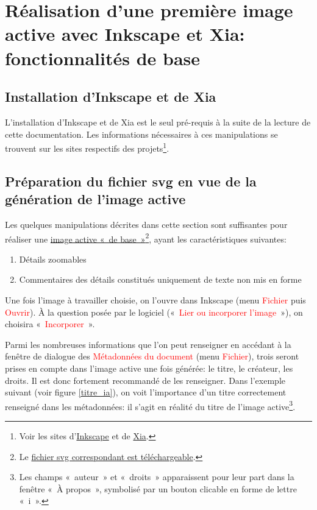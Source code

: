 \documentclass[a4paper,12pt]{report}
\newcommand{\chemin}[1]{\textcolor{red}{#1}}
\begin{document}
\section{Réalisation d'une première image active avec Inkscape et Xia: fonctionnalités de base}

\subsection{Installation d'Inkscape et de Xia}

L'installation d'Inkscape et de Xia est le seul pré-requis à la suite de la lecture de cette documentation.
Les informations nécessaires à ces manipulations se trouvent sur les sites respectifs des projets\footnote{Voir les sites d'\href{http://www.inkscape.org/}{Inkscape} et de \href{http://images-actives.crdp-versailles.fr/beta/}{Xia}.}.

\subsection{Préparation du fichier svg en vue de la génération de l'image active}\label{preparation_svg}

Les quelques manipulations décrites dans cette section sont suffisantes
pour réaliser une \href{http://geoffrey-gekiere.ac-versailles.fr/xia1}{image active «~de base~»}\footnote{Le 
\href{http://geoffrey-gekiere.ac-versailles.fr/xia1/svg/xia1.svg}{fichier svg correspondant est téléchargeable}.}, 
ayant les caractéristiques suivantes:
\begin{enumerate}
 \item Détails zoomables
 \item Commentaires des détails constitués uniquement de texte non mis en forme
\end{enumerate}


Une fois l'image à travailler choisie, on l'ouvre dans Inkscape (menu \chemin{Fichier} puis \chemin{Ouvrir}).
À la question posée par le logiciel («~\chemin{Lier ou incorporer l'image}~»), on choisira «~\chemin{Incorporer}~».

Parmi les nombreuses informations que l'on peut renseigner en accédant à la fenêtre de dialogue des 
\chemin{Métadonnées du document} (menu \chemin{Fichier}), trois seront prises en compte dans l'image active
une fois générée: le titre, le créateur, les droits.
Il est donc fortement recommandé de les renseigner.
Dans l'exemple suivant (voir figure \ref{titre_ia}), on voit l'importance d'un titre correctement
renseigné dans les métadonnées: il s'agit en réalité du titre de l'image active\footnote{Les champs 
«~auteur~» et «~droits~» apparaissent pour leur part dans la fenêtre «~À propos~», symbolisé par 
un bouton clicable en forme de lettre «~i~».}.
\end{document}
